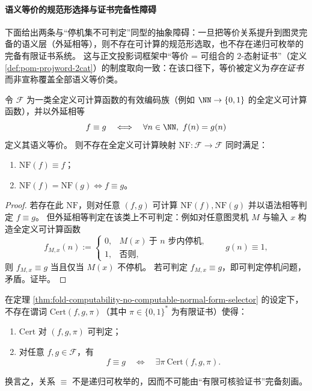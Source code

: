 \paragraph{语义等价的规范形选择与证书完备性障碍}
下面给出两条与“停机集不可判定”同型的抽象障碍：一旦把等价关系提升到图灵完备的语义层（外延相等），则不存在可计算的规范形选取，也不存在递归可枚举的完备有限证书系统。
这与正文投影词框架中“等价 = 可组合的 \(2\)-态射证书”（定义 \ref{def:pom-projword-2cat}）的制度取向一致：在该口径下，等价被定义为\emph{存在证书}而非宣称覆盖全部语义等价类。

\begin{theorem}[语义等价类不存在可计算的规范形选取]\label{thm:fold-computability-no-computable-normal-form-selector}
令 \(\mathcal F\) 为一类全定义可计算函数的有效编码族（例如 \(\NN\to\{0,1\}\) 的全定义可计算函数），并以外延相等
\[
f\equiv g\quad\Longleftrightarrow\quad \forall n\in\NN,\ f(n)=g(n)
\]
定义其语义等价。
则不存在全定义可计算映射 \(\mathrm{NF}:\mathcal F\to\mathcal F\) 同时满足：
\begin{enumerate}
\normalfont
  \item \(\mathrm{NF}(f)\equiv f\)；
  \item \(\mathrm{NF}(f)=\mathrm{NF}(g)\iff f\equiv g\)。
\end{enumerate}
\end{theorem}

\begin{proof}
若存在此 \(\mathrm{NF}\)，则对任意 \((f,g)\) 可计算 \(\mathrm{NF}(f),\mathrm{NF}(g)\) 并以语法相等判定 \(f\equiv g\)。
但外延相等判定在该类上不可判定：例如对任意图灵机 \(M\) 与输入 \(x\) 构造全定义可计算函数
\[
f_{M,x}(n):=
\begin{cases}
0,& M(x)\ \text{于 }n\text{ 步内停机},\\
1,& \text{否则},
\end{cases}
\qquad
g(n)\equiv 1,
\]
则 \(f_{M,x}\equiv g\) 当且仅当 \(M(x)\) 不停机。
若可判定 \(f_{M,x}\equiv g\)，即可判定停机问题，矛盾。证毕。
\end{proof}

\begin{theorem}[语义等价不存在递归可枚举的完备有限证书系统]\label{thm:fold-computability-no-re-complete-certificates-for-extensional-equality}
在定理 \ref{thm:fold-computability-no-computable-normal-form-selector} 的设定下，
不存在谓词 \(\mathrm{Cert}(f,g,\pi)\)（其中 \(\pi\in\{0,1\}^\ast\) 为有限证书）使得：
\begin{enumerate}
\normalfont
  \item \(\mathrm{Cert}\) 对 \((f,g,\pi)\) 可判定；
  \item 对任意 \(f,g\in\mathcal F\)，有
  \[
  f\equiv g\quad \Longleftrightarrow\quad \exists \pi\ \mathrm{Cert}(f,g,\pi).
  \]
\end{enumerate}
换言之，关系 \(\equiv\) 不是递归可枚举的，因而不可能由“有限可核验证书”完备刻画。
\end{theorem}

